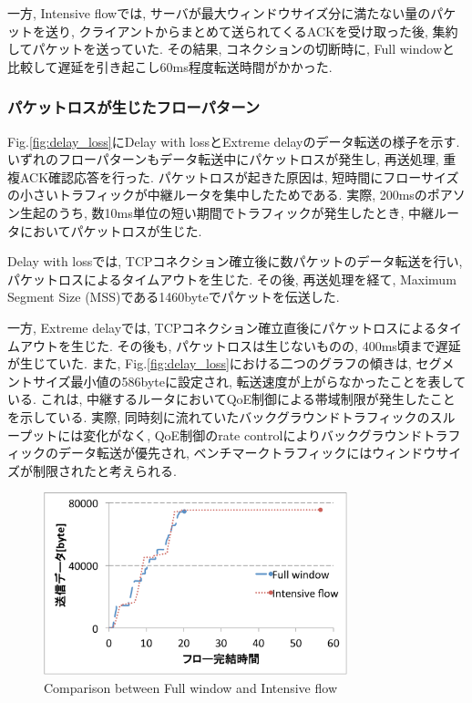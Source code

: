 一方, Intensive flowでは, サーバが最大ウィンドウサイズ分に満たない量のパケットを送り,
クライアントからまとめて送られてくるACKを受け取った後, 集約してパケットを送っていた.
その結果, コネクションの切断時に, Full windowと比較して遅延を引き起こし60ms程度転送時間がかかった.

\subsubsection{パケットロスが生じたフローパターン}
Fig.\ref{fig:delay_loss}にDelay with lossとExtreme delayのデータ転送の様子を示す.
いずれのフローパターンもデータ転送中にパケットロスが発生し, 再送処理, 重複ACK確認応答を行った.
パケットロスが起きた原因は, 短時間にフローサイズの小さいトラフィックが中継ルータを集中したためである.
実際, 200msのポアソン生起のうち, 数10ms単位の短い期間でトラフィックが発生したとき, 中継ルータにおいてパケットロスが生じた.

Delay with lossでは, TCPコネクション確立後に数パケットのデータ転送を行い, パケットロスによるタイムアウトを生じた.
その後, 再送処理を経て, Maximum Segment Size (MSS)である1460byteでパケットを伝送した.

一方, Extreme delayでは, TCPコネクション確立直後にパケットロスによるタイムアウトを生じた.
その後も, パケットロスは生じないものの, 400ms頃まで遅延が生じていた.
また, Fig.\ref{fig:delay_loss}における二つのグラフの傾きは, セグメントサイズ最小値の586byteに設定され,
転送速度が上がらなかったことを表している.
これは, 中継するルータにおいてQoE制御による帯域制限が発生したことを示している.
実際, 同時刻に流れていたバックグラウンドトラフィックのスループットには変化がなく, QoE制御のrate
controlによりバックグラウンドトラフィックのデータ転送が優先され, ベンチマークトラフィックにはウィンドウサイズが制限されたと考えられる.

\begin{figure}[t]
    \begin{center}
    \includegraphics[autoebb, width=250pt]{./img/full_intensive.pdf}
    \caption{Comparison between Full window and Intensive flow}
    \label{fig:full_intensive}
    \end{center}
\end{figure}

